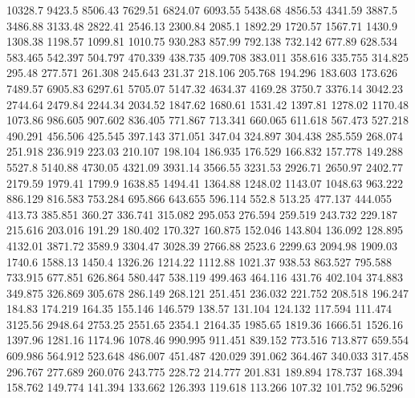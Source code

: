 10328.7      9423.5      8506.43      7629.51      6824.07      6093.55      5438.68      4856.53      4341.59      3887.5      3486.88      3133.48      2822.41      2546.13      2300.84      2085.1      1892.29      1720.57      1567.71      1430.9      1308.38      1198.57      1099.81      1010.75      930.283      857.99      792.138      732.142      677.89      628.534      583.465      542.397      504.797      470.339      438.735      409.708      383.011      358.616      335.755      314.825      295.48      277.571      261.308      245.643      231.37      218.106      205.768      194.296      183.603      173.626      
7489.57      6905.83      6297.61      5705.07      5147.32      4634.37      4169.28      3750.7      3376.14      3042.23      2744.64      2479.84      2244.34      2034.52      1847.62      1680.61      1531.42      1397.81      1278.02      1170.48      1073.86      986.605      907.602      836.405      771.867      713.341      660.065      611.618      567.473      527.218      490.291      456.506      425.545      397.143      371.051      347.04      324.897      304.438      285.559      268.074      251.918      236.919      223.03      210.107      198.104      186.935      176.529      166.832      157.778      149.288      
5527.8      5140.88      4730.05      4321.09      3931.14      3566.55      3231.53      2926.71      2650.97      2402.77      2179.59      1979.41      1799.9      1638.85      1494.41      1364.88      1248.02      1143.07      1048.63      963.222      886.129      816.583      753.284      695.866      643.655      596.114      552.8      513.25      477.137      444.055      413.73      385.851      360.27      336.741      315.082      295.053      276.594      259.519      243.732      229.187      215.616      203.016      191.29      180.402      170.327      160.875      152.046      143.804      136.092      128.895      
4132.01      3871.72      3589.9      3304.47      3028.39      2766.88      2523.6      2299.63      2094.98      1909.03      1740.6      1588.13      1450.4      1326.26      1214.22      1112.88      1021.37      938.53      863.527      795.588      733.915      677.851      626.864      580.447      538.119      499.463      464.116      431.76      402.104      374.883      349.875      326.869      305.678      286.149      268.121      251.451      236.032      221.752      208.518      196.247      184.83      174.219      164.35      155.146      146.579      138.57      131.104      124.132      117.594      111.474      
3125.56      2948.64      2753.25      2551.65      2354.1      2164.35      1985.65      1819.36      1666.51      1526.16      1397.96      1281.16      1174.96      1078.46      990.995      911.451      839.152      773.516      713.877      659.554      609.986      564.912      523.648      486.007      451.487      420.029      391.062      364.467      340.033      317.458      296.767      277.689      260.076      243.775      228.72      214.777      201.831      189.894      178.737      168.394      158.762      149.774      141.394      133.662      126.393      119.618      113.266      107.32      101.752      96.5296      
